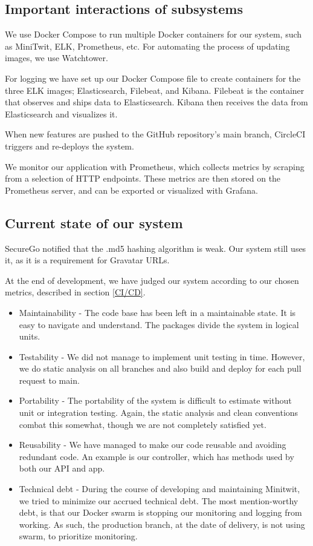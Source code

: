 \subsection{Important interactions of subsystems}
We use Docker Compose to run multiple Docker containers for our system, such as MiniTwit, ELK, Prometheus, etc. For automating the process of updating images, we use Watchtower. 


For logging we have set up our Docker Compose file to create containers for the three ELK images; Elasticsearch, Filebeat, and Kibana. Filebeat is the container that observes and ships data to Elasticsearch. Kibana then receives the data from Elasticsearch and visualizes it.  


When new features are pushed to the GitHub repository's main branch, CircleCI triggers and re-deploys the system. 


We monitor our application with Prometheus, which collects metrics by scraping from a selection of HTTP endpoints. These metrics are then stored on the Prometheus server, and can be exported or visualized with Grafana.

\subsection{Current state of our system}
SecureGo notified that the .md5 hashing algorithm is weak. Our system still uses it, as it is a requirement for Gravatar URLs.

At the end of development, we have judged our system according to our chosen metrics, described in section \ref{CI/CD}.
\begin{itemize}
    \item Maintainability - The code base has been left in a maintainable state. It is easy to navigate and understand. The packages divide the system in logical units.
    \item Testability  - We did not manage to implement unit testing in time. However, we do static analysis on all branches and also build and deploy for each pull request to main.
    \item Portability - The portability of the system is difficult to estimate without unit or integration testing. Again, the static analysis and clean conventions combat this somewhat, though we are not completely satisfied yet.
    \item Reusability - We have managed to make our code reusable and avoiding redundant code. An example is our controller, which has methods used by both our API and app.
    \item Technical debt - During the course of developing and maintaining Minitwit, we tried to minimize our accrued technical debt. The most mention-worthy debt, is that our Docker swarm is stopping our monitoring and logging from working. As such, the production branch, at the date of delivery, is not using swarm, to prioritize monitoring.  
\end{itemize}

